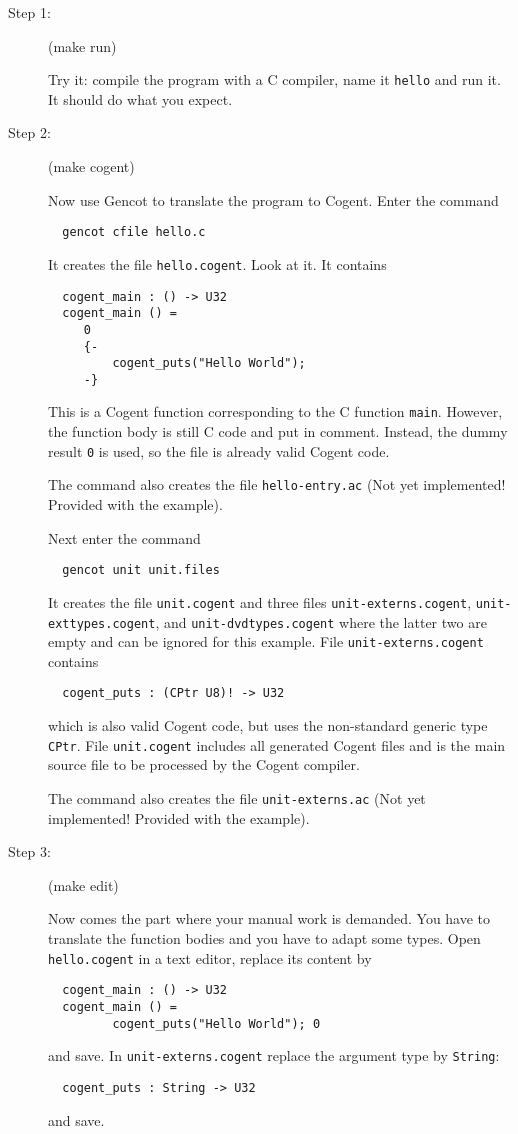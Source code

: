 \documentclass[a4paper]{report}
\newcommand{\code}[1]{\textnormal{\texttt{#1}}}
\begin{document}
\begin{description}
\item[Step 1:] (make run)

Try it: compile the program with a C compiler, name it \code{hello} and run it. It should do what you expect.

\item[Step 2:] (make cogent)

Now use Gencot to translate the program to Cogent. Enter the command
\begin{verbatim}
  gencot cfile hello.c
\end{verbatim}
It creates the file \code{hello.cogent}. Look at it. It contains
\begin{verbatim}
  cogent_main : () -> U32
  cogent_main () =
     0
     {-
         cogent_puts("Hello World");
     -}
\end{verbatim}
This is a Cogent function corresponding to the C function \code{main}. However, the function body is still C code
and put in comment. Instead, the dummy result \code{0} is used, so the file is already valid Cogent code.

The command also creates the file \code{hello-entry.ac} (Not yet implemented! Provided with the example).

Next enter the command
\begin{verbatim}
  gencot unit unit.files
\end{verbatim}
It creates the file \code{unit.cogent} and three files \code{unit-externs.cogent}, \code{unit-exttypes.cogent}, 
and \code{unit-dvdtypes.cogent} where the latter two are empty and can be ignored for this example. File 
\code{unit-externs.cogent} contains
\begin{verbatim}
  cogent_puts : (CPtr U8)! -> U32
\end{verbatim}
which is also valid Cogent code, but uses the non-standard generic type \code{CPtr}. File \code{unit.cogent}
includes all generated Cogent files and is the main source file to be processed by the Cogent compiler.

The command also creates the file \code{unit-externs.ac} (Not yet implemented! Provided with the example).

\item[Step 3:] (make edit)

Now comes the part where your manual work is demanded. You have to translate the function bodies and you have to adapt
some types. Open \code{hello.cogent} in a text editor, replace its content by
\begin{verbatim}
  cogent_main : () -> U32
  cogent_main () =
         cogent_puts("Hello World"); 0
\end{verbatim}
and save. In \code{unit-externs.cogent} replace the argument type by \code{String}:
\begin{verbatim}
  cogent_puts : String -> U32
\end{verbatim}
and save.


\end{description}
\end{document}
